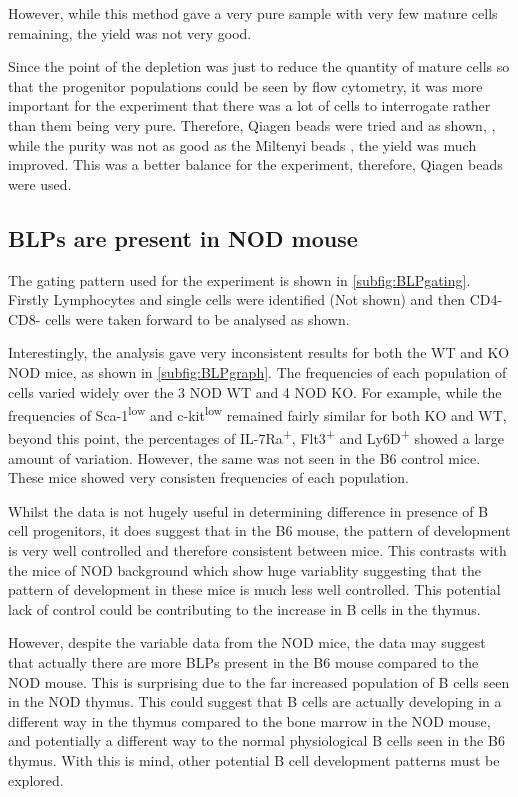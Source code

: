 However, while this method gave a very pure sample with very few mature cells remaining, the yield was not very good.

Since the point of the depletion was just to reduce the quantity of mature cells so that the progenitor populations could be seen by flow cytometry, it was more important for the experiment that there was a lot of cells to interrogate rather than them being very pure.
Therefore, Qiagen beads were tried and as shown, , while the purity was not as good as the Miltenyi beads , the yield was much improved.
This was a better balance for the experiment, therefore, Qiagen beads were used.


\subsection{BLPs are present in NOD mouse}

The gating pattern used for the experiment is shown in \cref{subfig:BLPgating}.
Firstly Lymphocytes and single cells were identified (Not shown) and then CD4-CD8- cells were taken forward to be analysed as shown.

Interestingly, the analysis gave very inconsistent results for both the WT and KO NOD mice, as shown in \cref{subfig:BLPgraph}.
The frequencies of each population of cells varied widely over the 3 NOD WT and 4 NOD KO. 
For example, while the frequencies of Sca-1\textsuperscript{low} and c-kit\textsuperscript{low} remained fairly similar for both KO and WT, beyond this point, the percentages of IL-7Ra\textsuperscript{+}, Flt3\textsuperscript{+} and Ly6D\textsuperscript{+} showed a large amount of variation.
However, the same was not seen in the B6 control mice.
These mice showed very consisten frequencies of each population.

Whilst the data is not hugely useful in determining difference in presence of B cell progenitors, it does suggest that in the B6 mouse, the pattern of development is very well controlled and therefore consistent between mice.
This contrasts with the mice of NOD background which show huge variablity suggesting that the pattern of development in these mice is much less well controlled.
This potential lack of control could be contributing to the increase in B cells in the thymus.

However, despite the variable data from the NOD mice, the data may suggest that actually there are more BLPs present in the B6 mouse compared to the NOD mouse.
This is surprising due to the far increased population of B cells seen in the NOD thymus.
This could suggest that B cells are actually developing in a different way in the thymus compared to the bone marrow in the NOD mouse, and potentially a different way to the normal physiological B cells seen in the B6 thymus.
With this is mind, other potential B cell development patterns must be explored.

